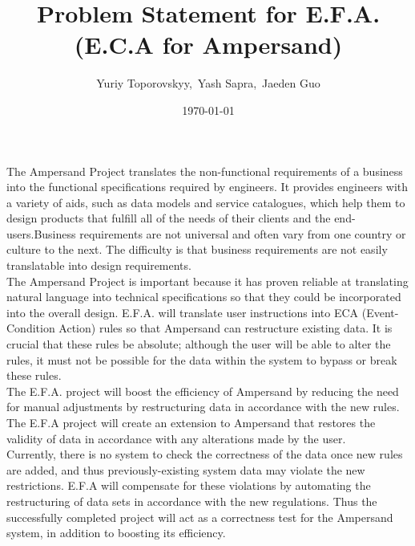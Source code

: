 \documentclass[12pt]{article}
\begin{document}
\title{Problem Statement for E.F.A. (E.C.A for Ampersand)} 
\author{Yuriy Toporovskyy,\ Yash Sapra,\ Jaeden Guo}
\date{\today}
\thispagestyle{empty}
\maketitle

\indent The Ampersand Project translates the non-functional requirements of a 
business into the functional specifications required by engineers. It provides 
engineers with a variety of aids, such as data models and service catalogues, 
which help them to design products that fulfill all of the needs of their 
clients and the end-users.Business requirements are not universal and often 
vary from one country or culture to the next. The difficulty is that business 
requirements are not easily translatable into design requirements.\\
\indent The Ampersand Project is important because it has proven reliable at 
translating natural language into technical specifications so that they could 
be incorporated into the overall design. E.F.A. will translate user 
instructions into ECA (Event-Condition Action) rules so that Ampersand can 
restructure existing data. It is crucial that these rules be absolute; although 
the user will be able to alter the rules, it must not be possible for the data 
within the system to bypass or break these rules. \\
\indent The E.F.A. project will boost the efficiency of Ampersand by reducing 
the need for manual adjustments by restructuring data in accordance with the 
new rules. The E.F.A project will create an extension to Ampersand that 
restores the validity of data in accordance with any alterations made by the 
user. \\ 
\indent Currently, there is no system to check the correctness of the data 
once 
new rules are added, and thus previously-existing system data may violate the 
new restrictions. E.F.A will compensate for these violations by automating the 
restructuring of data sets in accordance with the new regulations. Thus the 
successfully completed project will act as a correctness test for the Ampersand 
system, in addition to boosting its efficiency. 
\end{document}
